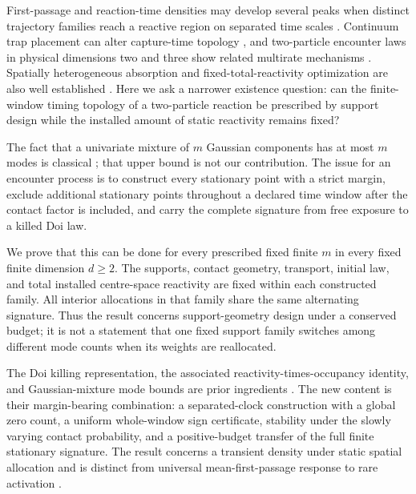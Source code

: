 \documentclass{iopjournal}
\theoremstyle{plain}
\theoremstyle{definition}
\begin{document}
First-passage and reaction-time densities may develop several peaks when
distinct trajectory families reach a reactive region on separated time
scales \cite{godecMetzler2017twochannel,
grebenkovMetzlerOshanin2018defocusing}.  Continuum trap placement can alter
capture-time topology \cite{lindsaySpoonmoreTzou2016narrow}, and
two-particle encounter laws in physical dimensions two and three show related
multirate mechanisms \cite{leVotEtAl2022encounter,giuggioli2020confined,
giuggioliEtAl2024multitarget}.  Spatially heterogeneous absorption and
fixed-total-reactivity optimization are also well established
\cite{nguyenGrebenkov2010porous,grebenkov2019heterogeneous,
nicolaouMulder2023flux}.  Here we ask a narrower existence question: can the
finite-window timing topology of a two-particle reaction be prescribed by
support design while the installed amount of static reactivity remains fixed?

The fact that a univariate mixture of \(m\) Gaussian components has at most
\(m\) modes is classical \cite{carreiraPerpinanWilliams2003modes,
amendolaEngstromHaase2020modes}; that upper bound is not our contribution.
The issue for an encounter process is to construct every stationary point
with a strict margin, exclude additional stationary points throughout a
declared time window after the contact factor is included, and carry the
complete signature from free exposure to a killed Doi law.

We prove that this can be done for every prescribed fixed finite \(m\) in
every fixed finite dimension \(d\ge2\).  The supports, contact geometry,
transport, initial law, and total installed centre-space reactivity are fixed
within each constructed family.  All interior allocations in that family
share the same alternating signature.  Thus the result concerns
support-geometry design under a conserved budget; it is not a statement that
one fixed support family switches among different mode counts when its
weights are reallocated.

The Doi killing representation, the associated reactivity-times-occupancy
identity, and Gaussian-mixture mode bounds are prior ingredients
\cite{doi1976stochastic,isaacsonMauroNewby2016uniform,
pruestelMeierSchellersheim2014area,bressloff2022feynmanKac}.  The new content
is their margin-bearing combination: a separated-clock construction with a
global zero count, a uniform whole-window sign certificate, stability under
the slowly varying contact probability, and a positive-budget transfer of
the full finite stationary signature.  The result concerns a transient
density under static spatial allocation and is distinct from universal
mean-first-passage response to rare activation
\cite{keidarReuveni2026linear}.
\end{document}
